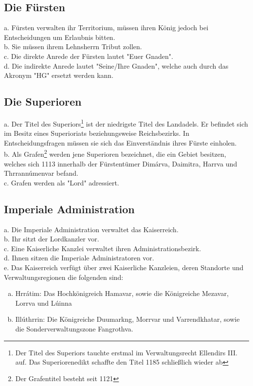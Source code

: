 \documentclass{article}
\begin{document}
\subsection{Die Fürsten}
a. Fürsten verwalten ihr Territorium, müssen ihren König jedoch bei Entscheidungen um Erlaubnis bitten.  \\
b. Sie müssen ihrem Lehnsherrn Tribut zollen.  \\
c. Die direkte Anrede der Fürsten lautet "Euer Gnaden". \\
d. Die indirekte Anrede lautet "Seine/Ihre Gnaden", welche auch durch das Akronym "HG" ersetzt werden kann.  

\subsection{Die Superioren}
a. Der Titel des Superiors\footnote{Der Titel des Superiors tauchte erstmal im Verwaltungsrecht Ellendirs III. auf. Das Superiorenedikt schaffte den Titel 1185 schließlich wieder ab} ist der niedrigste Titel des Landadels. Er befindet sich im Besitz eines Superioriats beziehungsweise Reichsbezirks. In Entscheidungsfragen müssen sie sich das Einverständnis ihres Fürste einholen.  \\
b. Als Grafen\footnote{Der Grafentitel besteht seit 1121} werden jene Superioren bezeichnet, die ein Gebiet besitzen, welches sich 1113 innerhalb der Fürstentümer Dimárva, Daimitra, Harrva und Thrrannúmenvar befand.  \\
c. Grafen werden als "Lord" adressiert.  

\subsection{Imperiale Administration}
a. Die Imperiale Administration verwaltet das Kaiserreich.  \\
b. Ihr sitzt der Lordkanzler vor.  \\
c. Eine Kaiserliche Kanzlei verwaltet ihren Administrationsbezirk.  \\
d. Ihnen sitzen die Imperiale Administratoren vor.  \\
e. Das Kaiserreich verfügt über zwei Kaiserliche Kanzleien, deren Standorte und Verwaltungsregionen die folgenden sind:  
\begin{enumerate}[a)]
\item Hrrátim: Das Hochkönigreich Hamavar, sowie die Königreiche Mezavar, Lorrva und Lúinna  
\item Illúthrrin: Die Königreiche Duumarkng, Morrvar und Varrendkhatar, sowie die Sonderverwaltungszone Fangrothva.
\end{enumerate}
\end{document}

